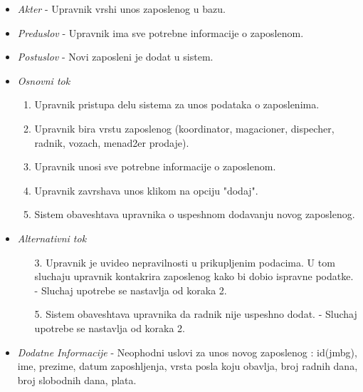 \documentclass[10 pt]{article}
\begin{document}
		\begin{itemize}
			\item\textit{Akter} - Upravnik vrshi unos zaposlenog u bazu.

			
			\item\textit{Preduslov} - Upravnik ima sve potrebne informacije o zaposlenom.

			
			\item\textit{Postuslov} - Novi zaposleni je dodat u sistem.

			
			\item\textit{Osnovni tok}
				\begin{enumerate}
					\item Upravnik pristupa delu sistema za unos podataka o zaposlenima.

					\item Upravnik bira vrstu zaposlenog (koordinator, magacioner, dispecher, radnik, vozach, menad2er prodaje).

					\item Upravnik unosi sve potrebne informacije o zaposlenom.

					\item Upravnik zavrshava unos klikom na opciju "dodaj".

					\item Sistem obaveshtava upravnika o uspeshnom dodavanju novog zaposlenog.

				\end{enumerate}
			
			\item\textit{Alternativni tok}
				\begin{enumerate}
					\item [3.] Upravnik je uvideo nepravilnosti u prikupljenim podacima. U tom sluchaju upravnik kontakrira zaposlenog kako bi dobio ispravne podatke.
- Sluchaj upotrebe se nastavlja od koraka 2.

					\item [5.] Sistem obaveshtava upravnika  da radnik nije uspeshno dodat. - Sluchaj upotrebe se nastavlja  od koraka 2.

				\end{enumerate}
				
			\item\textit{Dodatne Informacije} - Neophodni uslovi za unos novog zaposlenog : id(jmbg), ime, prezime, datum zaposhljenja, vrsta posla koju obavlja, broj radnih dana, broj slobodnih dana, plata.

			
		\end{itemize}
	
\end{document}
